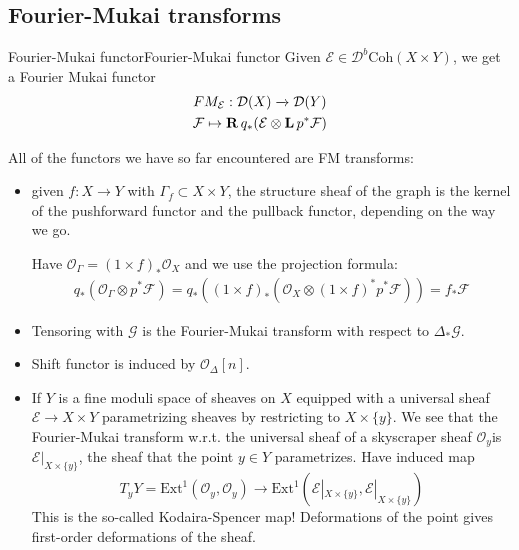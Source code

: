 

\subsection{Fourier-Mukai transforms}

\begin{definition}{Fourier-Mukai functor}{Fourier-Mukai functor}
    Given $\mathcal{E}\in \mathcal{D}^b\mathrm{Coh}(X\times Y)$, we get a Fourier Mukai functor $$\begin{gathered}
    FM_{\mathcal{E}}:\mathcal{D}(X)\xrightarrow{}\mathcal{D}(Y)\\
    \mathcal{F}\mapsto \operatorname{\mathbf{R}} q_{*}(\mathcal{E}\otimes \operatorname{\mathbf{L}} p^*\mathcal{F})
    \end{gathered}$$  
\end{definition}

All of the functors we have so far encountered are FM transforms:
\begin{itemize}
    \item  given $f:X\rightarrow Y$ with $\Gamma_f\subset X\times Y$, the structure sheaf of the graph is the kernel of the pushforward functor and the pullback functor, depending on the way we go.

    Have $\mathcal{O}_{\Gamma}=(1\times f)_{*}\mathcal{O}_{X}$ and we use the projection formula: $$\begin{gathered}
q_{*}(\mathcal{O}_{\Gamma}\otimes p^*\mathcal{F})=q_{*}((1\times f)_{*}(\mathcal{O}_{X}\otimes (1\times f)^*p^*\mathcal{F}))=f_{*}\mathcal{F}\end{gathered}$$

    \item Tensoring with $\mathcal{G}$ is the Fourier-Mukai transform with respect to $\Delta_{*}\mathcal{G}$.
    \item Shift functor is induced by $\mathcal{O}_{\Delta}[n]$.
    \item If $Y$ is a fine moduli space of sheaves on $X$ equipped with a universal sheaf $\mathcal{E}\rightarrow X\times Y$ parametrizing sheaves by restricting to $X\times \{y\}$. We see that the Fourier-Mukai transform w.r.t. the universal sheaf of a skyscraper sheaf $\mathcal{O}_{y}$is $\mathcal{E}|_{X\times \{y\}}$, the sheaf that the point $y\in Y$ parametrizes. Have induced map $$T_{y}Y=\mathrm{Ext}^1(\mathcal{O}_{y},\mathcal{O}_{y})\rightarrow \mathrm{Ext}^1(\mathcal{E}|_{X\times \{y\}},\mathcal{E}|_{X\times \{y\}})$$This is the so-called Kodaira-Spencer map! Deformations of the point gives first-order deformations of the sheaf.
\end{itemize}

